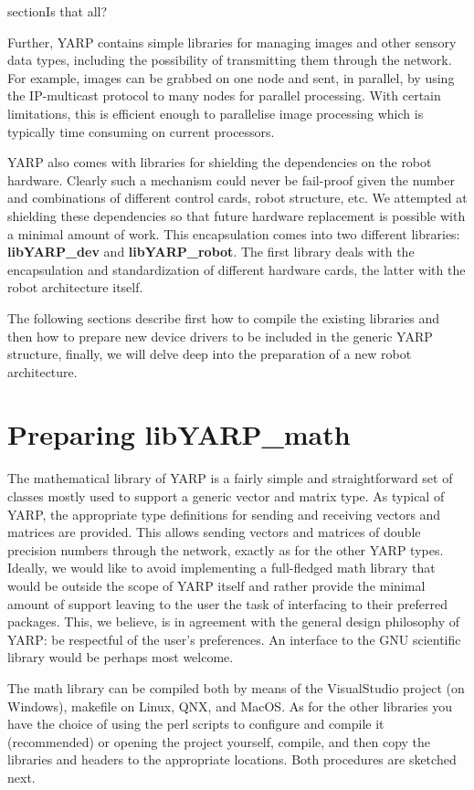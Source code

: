 section{Is that all?}

Further, YARP contains simple libraries for managing images and other
sensory data types, including the possibility of transmitting them
through the network. For example, images can be grabbed on one node
and sent, in parallel, by using the IP-multicast protocol to many
nodes for parallel processing. With certain limitations, this is
efficient enough to parallelise image processing which is typically
time consuming on current processors.

YARP also comes with libraries for shielding the dependencies on the
robot hardware. Clearly such a mechanism could never be fail-proof
given the number and combinations of different control cards, robot
structure, etc. We attempted at shielding these dependencies so that
future hardware replacement is possible with a minimal amount of
work. This encapsulation comes into two different libraries: {\bf
libYARP\_dev} and {\bf libYARP\_robot}. The first library deals with
the encapsulation and standardization of different hardware cards, the
latter with the robot architecture itself.

The following sections describe first how to compile the existing
libraries and then how to prepare new device drivers to be included in
the generic YARP structure, finally, we will delve deep into the
preparation of a new robot architecture.
 
\section{Preparing libYARP\_math}
The mathematical library of YARP is a fairly simple and straightforward set of classes mostly used to support a generic vector and matrix type. As typical of YARP, the appropriate type definitions for sending and receiving vectors and matrices are provided. This allows sending vectors and matrices of double precision numbers through the network, exactly as for the other YARP types. Ideally, we would like to avoid implementing a full-fledged math library that would be outside the scope of YARP itself and rather provide the minimal amount of support leaving to the user the task of interfacing to their preferred packages. This, we believe, is in agreement with the general design philosophy of YARP: be respectful of the user's preferences. An interface to the GNU scientific library would be perhaps most welcome.

The math library can be compiled both by means of the VisualStudio project (on Windows), makefile on Linux, QNX, and MacOS. As for the other libraries you have the choice of using the perl scripts to configure and compile it (recommended) or opening the project yourself, compile, and then copy the libraries and headers to the appropriate locations. Both procedures are sketched next.

